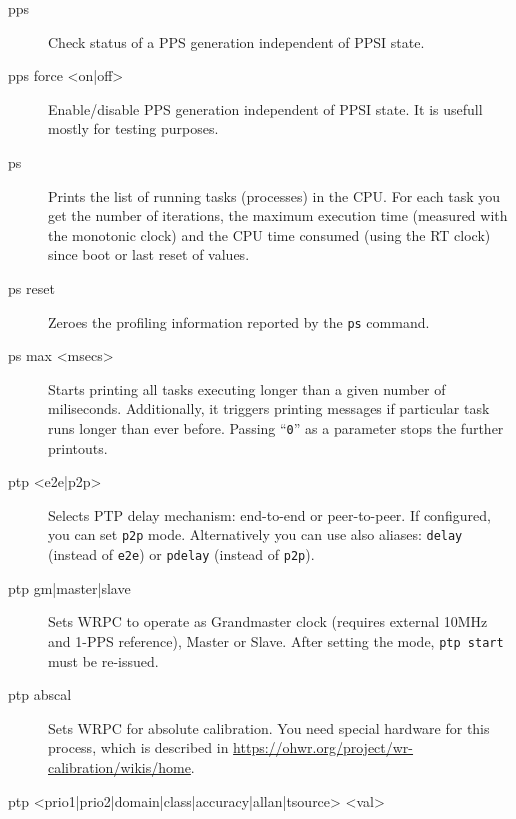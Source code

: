 \documentclass[a4paper, 12pt]{article}
\renewcommand{\_}{\underscore\allowbreak}
\newcommand{\code}[1]{\texttt{#1}}
\begin{document}
\begin{description}
\item[pps] \mbox{}

  Check status of a PPS generation independent of PPSI state.

\item[pps force <on|off>] \mbox{}

  Enable/disable PPS generation independent of PPSI state. It is
  usefull mostly for testing purposes.

\item[ps] \mbox{}

  Prints the list of running tasks (processes) in the CPU. For each
  task you get the number of iterations, the maximum execution time
  (measured with the monotonic clock) and the CPU time consumed (using
  the RT clock) since boot or last reset of values.

\item[ps reset] \mbox{}

  Zeroes the profiling information reported by the \code{ps} command.

\item[ps max <msecs>] \mbox{}

  Starts printing all tasks executing longer than a given number of
  miliseconds. Additionally, it triggers printing messages if
  particular task runs longer than ever before. Passing ``\code{0}''
  as a parameter stops the further printouts.

\item[ptp <e2e|p2p>] \mbox{}

  Selects PTP delay mechanism: end-to-end or peer-to-peer.  If
  configured, you can set \texttt{p2p} mode. Alternatively you can use
  also aliases: \texttt{delay} (instead of \texttt{e2e}) or
  \texttt{pdelay} (instead of \texttt{p2p}).

\item[ptp gm|master|slave] \mbox{}

  Sets WRPC to operate as Grandmaster clock (requires external 10MHz
  and 1-PPS reference), Master or Slave. After setting the mode,
  \texttt{ptp start} must be re-issued.

\item[ptp abscal] \mbox{}

  Sets WRPC for absolute calibration.  You need special hardware for
  this process, which is described in
  \url{https://ohwr.org/project/wr-calibration/wikis/home}.

\item[ptp <prio1|prio2|domain|class|accuracy|allan|tsource> <val>] \mbox{}


\end{description}
\end{document}
